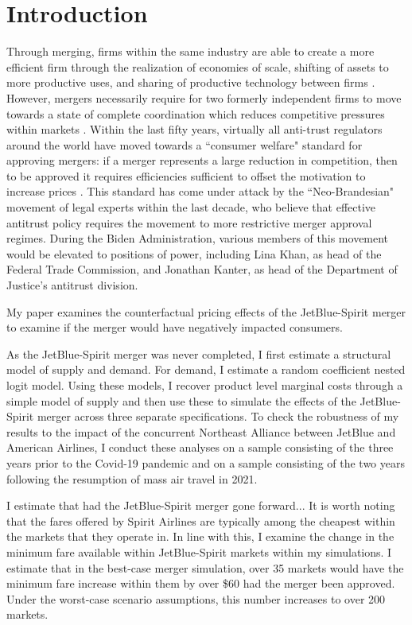 \documentclass{article}
\begin{document}
    \section{Introduction}

        Through merging, firms within the same industry are able to create a more efficient firm through the realization of economies of scale, shifting of assets to more productive uses, and sharing of productive technology between firms \citep{williamson_economies_1968, farrell_horizontal_1990, kaplow_improving_2025}. However, mergers necessarily require for two formerly independent firms to move towards a state of complete coordination which reduces competitive pressures within markets \citep{stigler_theory_1964}. Within the last fifty years, virtually all anti-trust regulators around the world have moved towards a ``consumer welfare" standard for approving mergers: if a merger represents a large reduction in competition, then to be approved it requires efficiencies sufficient to offset the motivation to increase prices \citep{whinston_chapter_2007}. This standard has come under attack by the ``Neo-Brandesian" movement of legal experts within the last decade, who believe that effective antitrust policy requires the movement to more restrictive merger approval regimes. During the Biden Administration, various members of this movement would be elevated to positions of power, including Lina Khan, as head of the Federal Trade Commission, and Jonathan Kanter, as head of the Department of Justice's antitrust division.  


    My paper examines the counterfactual pricing effects of the JetBlue-Spirit merger to examine if the merger would have negatively impacted consumers. %

    As the JetBlue-Spirit merger was never completed, I first estimate a structural model of supply and demand. For demand, I estimate a random coefficient nested logit model. Using these models, I recover product level marginal costs through a simple model of supply and then use these to simulate the effects of the JetBlue-Spirit merger across three separate specifications. To check the robustness of my results to the impact of the concurrent Northeast Alliance between JetBlue and American Airlines, I conduct these analyses on a sample consisting of the three years prior to the Covid-19 pandemic and on a sample consisting of the two years following the resumption of mass air travel in 2021. 

    I estimate that had the JetBlue-Spirit merger gone forward... It is worth noting that the fares offered by Spirit Airlines are typically among the cheapest within the markets that they operate in. In line with this, I examine the change in the minimum fare available within JetBlue-Spirit markets within my simulations. I estimate that in the best-case merger simulation, over 35 markets would have the minimum fare increase within them by over \$60 had the merger been approved. Under the worst-case scenario assumptions, this number increases to over 200 markets. 
\end{document}
